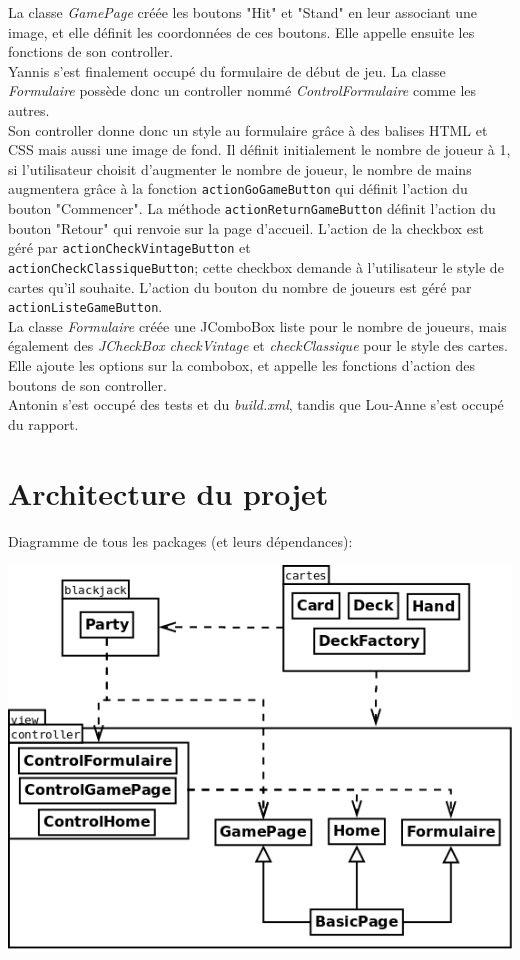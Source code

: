 \documentclass[french,12pt]{article}
\begin{document}
La classe \textsl{GamePage} créée les boutons "Hit" et "Stand" en leur associant une image, et elle définit les coordonnées de ces boutons. Elle appelle ensuite les fonctions de son controller.\\

Yannis s'est finalement occupé du formulaire de début de jeu. La classe \textsl{Formulaire} possède donc un controller nommé \textsl{ControlFormulaire} comme les autres. \\
Son controller donne donc un style au formulaire grâce à des balises HTML et CSS mais aussi une image de fond. Il définit initialement le nombre de joueur à 1, si l'utilisateur choisit d'augmenter le nombre de joueur, le nombre de mains augmentera grâce à la fonction \texttt{actionGoGameButton} qui définit l'action du bouton "Commencer". 
La méthode \texttt{actionReturnGameButton} définit l'action du bouton "Retour" qui renvoie sur la page d'accueil. L'action de la checkbox est géré par \texttt{actionCheckVintageButton} et \\ \texttt{actionCheckClassiqueButton}; cette checkbox demande à l'utilisateur le style de cartes qu'il souhaite. L'action du bouton du nombre de joueurs est géré par \texttt{actionListeGameButton}. \\
La classe \textsl{Formulaire} créée une JComboBox liste pour le nombre de joueurs, mais également des \textsl{JCheckBox checkVintage} et \textsl{checkClassique} pour le style des cartes. Elle ajoute les options sur la combobox, et appelle les fonctions d'action des boutons de son controller.\\

Antonin s'est occupé des tests et du \textsl{build.xml}, tandis que Lou-Anne s'est occupé du rapport.

\section{Architecture du projet} \label{architecture}

Diagramme de tous les packages (et leurs dépendances):

\begin{center}
	\includegraphics[scale=0.4]{img/jeu.png}	
\end{center}
\end{document}
